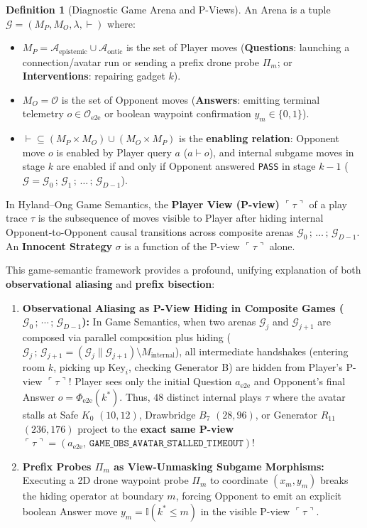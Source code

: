 \documentclass[11pt,a4paper]{article}
\theoremstyle{definition}
\newtheorem{definition}[theorem]{Definition}
\theoremstyle{remark}
\begin{document}
\begin{definition}[Diagnostic Game Arena and P-Views]
An Arena is a tuple $\mathcal{G} = (M_P, M_O, \lambda, \vdash)$ where:
\begin{itemize}[noitemsep]
    \item $M_P = \mathcal{A}_{\text{epistemic}} \cup \mathcal{A}_{\text{ontic}}$ is the set of Player moves (\textbf{Questions}: launching a connection/avatar run or sending a prefix drone probe $\Pi_m$; or \textbf{Interventions}: repairing gadget $k$).
    \item $M_O = \mathcal{O}$ is the set of Opponent moves (\textbf{Answers}: emitting terminal telemetry $o \in \mathcal{O}_{\text{e2e}}$ or boolean waypoint confirmation $y_m \in \{0,1\}$).
    \item $\vdash \subseteq (M_P \times M_O) \cup (M_O \times M_P)$ is the \textbf{enabling relation}: Opponent move $o$ is enabled by Player query $a$ ($a \vdash o$), and internal subgame moves in stage $k$ are enabled if and only if Opponent answered \texttt{PASS} in stage $k-1$ ($\mathcal{G} = \mathcal{G}_0 \,;\, \mathcal{G}_1 \,;\, \dots \,;\, \mathcal{G}_{D-1}$).
\end{itemize}
In Hyland--Ong Game Semantics, the \textbf{Player View (P-view)} $\ulcorner \tau \urcorner$ of a play trace $\tau$ is the subsequence of moves visible to Player after hiding internal Opponent-to-Opponent causal transitions across composite arenas $\mathcal{G}_0 \,;\, \dots \,;\, \mathcal{G}_{D-1}$. An \textbf{Innocent Strategy} $\sigma$ is a function of the P-view $\ulcorner \tau \urcorner$ alone.
\end{definition}

This game-semantic framework provides a profound, unifying explanation of both \textbf{observational aliasing} and \textbf{prefix bisection}:
\begin{enumerate}
    \item \textbf{Observational Aliasing as P-View Hiding in Composite Games ($\mathcal{G}_0 \,;\, \cdots \,;\, \mathcal{G}_{D-1}$):}
    In Game Semantics, when two arenas $\mathcal{G}_j$ and $\mathcal{G}_{j+1}$ are composed via parallel composition plus hiding ($\mathcal{G}_j \,;\, \mathcal{G}_{j+1} = (\mathcal{G}_j \parallel \mathcal{G}_{j+1}) \setminus M_{\text{internal}}$), all intermediate handshakes (entering room $k$, picking up $\text{Key}_i$, checking Generator B) are hidden from Player's P-view $\ulcorner \tau \urcorner$! Player sees only the initial Question $a_{\text{e2e}}$ and Opponent's final Answer $o = \Phi_{\text{e2e}}(k^*)$. Thus, $48$ distinct internal plays $\tau$ where the avatar stalls at Safe $K_0$ $(10,12)$, Drawbridge $B_7$ $(28,96)$, or Generator $R_{11}$ $(236,176)$ project to the \textbf{exact same P-view} $\ulcorner \tau \urcorner = (a_{\text{e2e}}, \, \texttt{GAME\_OBS\_AVATAR\_STALLED\_TIMEOUT})$!
    \item \textbf{Prefix Probes $\Pi_m$ as View-Unmasking Subgame Morphisms:}
    Executing a 2D drone waypoint probe $\Pi_m$ to coordinate $(x_m, y_m)$ breaks the hiding operator at boundary $m$, forcing Opponent to emit an explicit boolean Answer move $y_m = \mathbb{I}(k^* \le m)$ in the visible P-view $\ulcorner \tau \urcorner$.
\end{enumerate}
\end{document}
